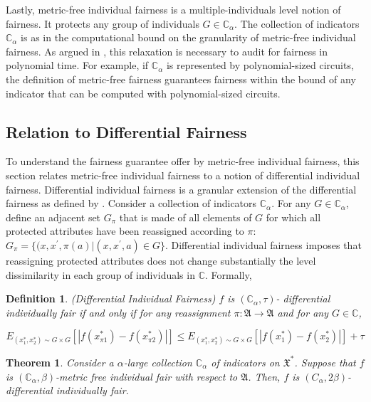 \documentclass{article}
\newtheorem{thm}{Theorem}[section]
\newtheorem{defn}{Definition}[section]
\begin{document}
\bigskip
 Lastly, metric-free individual fairness is a multiple-individuals level notion of fairness. It protects any group of individuals $G\in \mathbb{C}_{\alpha}$. The collection of indicators $\mathbb{C}_{\alpha}$ is as in \cite{kim2018fairness} the computational bound on the granularity of metric-free individual fairness. As argued in \cite{kim2018fairness}, this relaxation is necessary to audit for fairness in polynomial time. For example, if $\mathbb{C}_{\alpha}$ is represented by polynomial-sized circuits, the definition of metric-free fairness guarantees fairness within the bound of any indicator that can be computed with polynomial-sized circuits.
 
 
 \subsection{Relation to Differential Fairness}
 To understand the fairness guarantee offer by  metric-free individual fairness, this section relates metric-free individual fairness to a notion of differential individual fairness. Differential individual fairness is a granular extension of the differential fairness as defined by \cite{Foulds2018}. Consider a collection of indicators $\mathbb{C}_{\alpha}$. For any $G\in \mathbb{C}_{\alpha}$, define an adjacent set $G_{\pi}$ that is made of all elements of $G$ for which all protected attributes have been reassigned according to $\pi$: $G_{\pi}=\{(x, x^{'}, \pi(a)| (x, x^{'}, a) \in G\}$. Differential individual fairness imposes that reassigning protected attributes does not change substantially the 
 level dissimilarity in each group of individuals in $\mathbb{C}$. Formally, 
 
 \begin{defn} (Differential Individual Fairness)
 \label{def: dif}
 $f$ is $(\mathbb{C}_{\alpha}, \tau)$- differential individually fair if and only if for any reassignment $\pi: \mathfrak{A} \rightarrow \mathfrak{A}$ and for any $G \in \mathbb{C}$,
 
 $$  E_{(x^{*}_{1}, x_{2}^{*})\sim G\times G}\left[\left|f(x_{\pi1}^{*}) - f(x_{\pi2}^{*})\right|\right] \leq E_{(x^{*}_{1}, x_{2}^{*})\sim G\times G}\left[\left|f(x_{1}^{*}) - f(x_{2}^{*})\right|\right] + \tau $$
 \end{defn}
 
 
 \begin{thm}
 \label{thm: dif}
 Consider a $\alpha$-large collection $\mathbb{C}_{\alpha}$ of indicators on $\mathfrak{X}^{*}$. Suppose that $f$ is $(\mathbb{C}_{\alpha}, \beta)$-metric free individual fair with respect to $\mathfrak{A}$. Then, $f$ is $(C_{\alpha}, 2\beta)$-differential individually fair.
 \end{thm}
 
\end{document}
